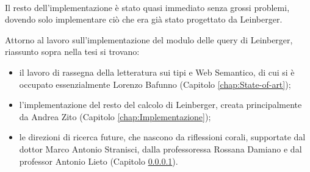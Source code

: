 \paragraph{} Il resto dell'implementazione è stato quasi immediato senza grossi problemi, dovendo solo implementare ciò che era già stato progettato da Leinberger.

Attorno al lavoro sull'implementazione del modulo delle query di Leinberger, riassunto sopra nella tesi si trovano:
\begin{itemize}
\item il lavoro di rassegna della letteratura sui tipi e Web Semantico, di cui si è occupato essenzialmente Lorenzo Bafunno (Capitolo \ref{chap:State-of-art});
\item l'implementazione del resto del calcolo di Leinberger, creata principalmente da Andrea Zito (Capitolo \ref{chap:Implementazione});
\item le direzioni di ricerca future, che nascono da riflessioni corali, supportate dal dottor Marco Antonio Stranisci, dalla professoressa Rossana Damiano e dal professor Antonio Lieto (Capitolo \ref{}).
\end{itemize}